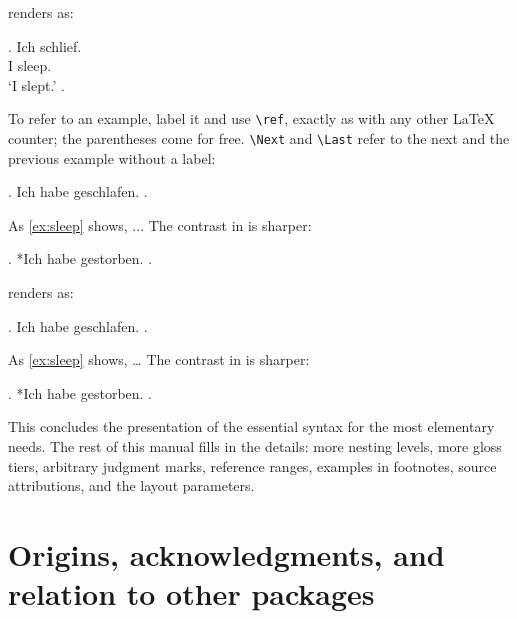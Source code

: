 \documentclass[11pt,a4paper]{article}
\newcommand{\cs}[1]{\texttt{\textbackslash #1}}
\newcommand{\rendered}{\par\medskip\noindent\textcolor{gray!70}{\small renders as:}\par\nobreak\smallskip}
\newcommand{\afterex}{\par\addvspace{\medskipamount}}
\begin{document}
\rendered
\ex. \gll Ich schlief. \\
     I sleep. \\
\glt `I slept.'
\z.

\afterex
To refer to an example, label it and use \cs{ref}, exactly as with any
other \LaTeX{} counter; the parentheses come for free. \cs{Next} and
\cs{Last} refer to the next and the previous example without a label:

\begin{code}
\ex.\label{ex:sleep} Ich habe geschlafen.
\z.

As \ref{ex:sleep} shows, ... The contrast in \Next is sharper:

\ex. *Ich habe gestorben.
\z.
\end{code}

\rendered
\ex.\label{ex:sleep} Ich habe geschlafen.
\z.

As \ref{ex:sleep} shows, \dots{} The contrast in \Next is sharper:

\ex. *Ich habe gestorben.
\z.

\afterex
This concludes the presentation of the essential syntax for the most elementary needs.
The rest of this manual fills in the details: more nesting levels,
more gloss tiers, arbitrary judgment marks, reference ranges, examples
in footnotes, source attributions, and the layout parameters.

\section{Origins, acknowledgments, and relation to other packages}
\label{sec:origins}
\end{document}
